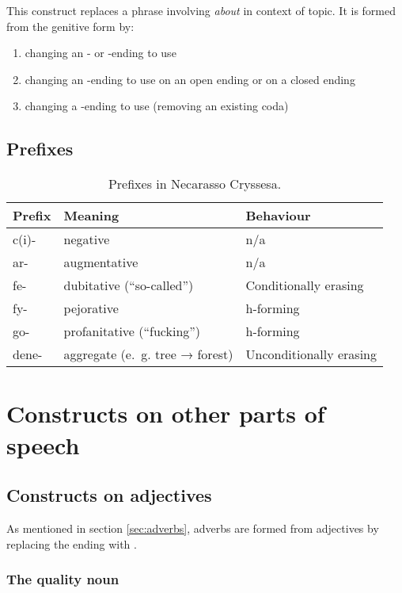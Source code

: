 \documentclass{book}
\begin{document}
This construct replaces a phrase involving  \emph{about} in context of topic. It is formed from the genitive form by:

\begin{enumerate}
  \item changing an - or -ending to use 
  \item changing an -ending to use  on an open ending or  on a closed ending
  \item changing a -ending to use  (removing an existing coda)
\end{enumerate}

\section{Prefixes}

\begin{table}[H]
  \caption{Prefixes in Necarasso Cryssesa.}
  \centering
	\begin{tabular}{|l|l|l|}
		\hline
		Prefix & Meaning & Behaviour \\ \hline
		c(i)- & negative & n/a \\
		ar- & augmentative & n/a \\
		fe- & dubitative (``so-called'') & Conditionally erasing \\
		fy- & pejorative & h-forming \\
		go- & profanitative (``fucking'') & h-forming \\
		dene- & aggregate (e.~g. tree → forest) & Unconditionally erasing \\
		\hline
	\end{tabular}
\end{table}

\chapter{Constructs on other parts of speech}

\section{Constructs on adjectives}

As mentioned in section \ref{sec:adverbs}, adverbs are formed from adjectives by replacing the ending with .

\subsection{The quality noun}
\end{document}

